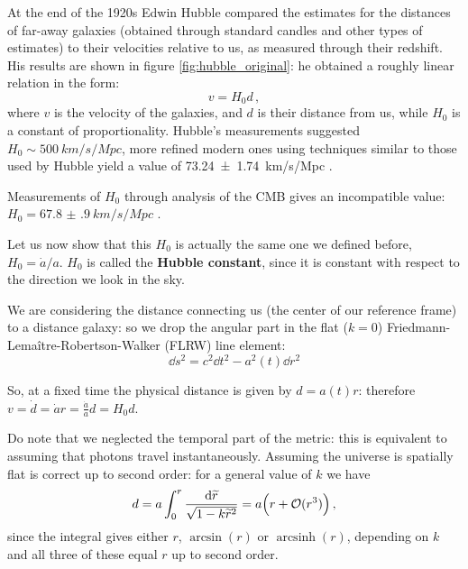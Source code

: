 \documentclass[main.tex]{subfiles}
\begin{document}
At the end of the 1920s Edwin Hubble compared the estimates for the distances of far-away galaxies (obtained through standard candles and other types of estimates) to their velocities relative to us, as measured through their redshift. His results are shown in figure \ref{fig:hubble_original}: he obtained a roughly linear relation in the form:
%
\begin{equation}
  v = H_0 d\,,
\end{equation}
%
where \(v\) is the velocity of the galaxies, and \(d\) is their distance from us, while \(H_0 \) is a constant of proportionality.
Hubble's measurements suggested \(H_0 \sim \SI{500}{km/s/Mpc}\), more refined modern ones using techniques similar to those used by Hubble yield a value of \SI{73.24(174)}{km/s/Mpc} \cite{riessDeterminationLocalValue2016}.

Measurements of \(H_0 \) through analysis of the CMB gives an incompatible value: \(H_0 = \SI{67.8(9)}{km/s/Mpc}\) \cite{PlanckCollaboration:2016XIII}.


Let us now show that this \(H_0 \) is actually the same one we defined before, \(H_0 = \dot{a} / a\).
\(H_0 \) is called the \textbf{Hubble constant}, since it is constant with respect to the direction we look in the sky.


We are considering the distance connecting us (the center of our reference frame) to a distance galaxy: so we drop the angular part in the flat (\(k = 0\)) Friedmann-Lemaître-Robertson-Walker (FLRW) line element:
%
\begin{equation}
  \dd{s^2} = c^2 \dd{t^2} - a^2(t) \dd{r^2}
\end{equation}

So, at a fixed time the physical distance is given by \(d = a(t) r\): therefore \(v = \dot{d} = \dot{a}r = \frac{\dot{a} }{a} d = H_0 d\). 

Do note that we neglected the temporal part of the metric: this is equivalent to assuming that photons travel instantaneously.
Assuming the universe is spatially flat is correct up to second order: for a general value of \(k\) we have 
%
\begin{align}
d = a \int_{0}^{r} \frac{ \dd{\widetilde{r}} }{\sqrt{1 - k \widetilde{r}^2}} = a  \qty( r + \mathcal{O}(r^3))
\,,
\end{align}
%
since the integral gives either \(r\), \(\arcsin(r)\) or \(\operatorname{arcsinh}(r)\), depending on \(k\) and all three of these equal \(r\) up to second order.
\end{document}
